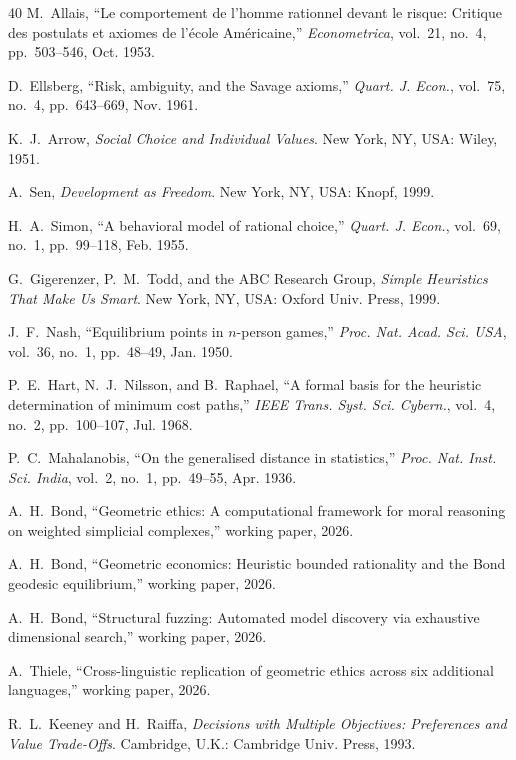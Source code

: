 \documentclass[journal]{IEEEtran}
\begin{document}
\begin{thebibliography}{40}
M.~Allais, ``Le comportement de l'homme rationnel devant le risque: Critique des postulats et axiomes de l'\'{e}cole Am\'{e}ricaine,''
\emph{Econometrica}, vol.~21, no.~4, pp.~503--546, Oct. 1953.

D.~Ellsberg, ``Risk, ambiguity, and the Savage axioms,''
\emph{Quart. J. Econ.}, vol.~75, no.~4, pp.~643--669, Nov. 1961.

K.~J.~Arrow, \emph{Social Choice and Individual Values}.
New York, NY, USA: Wiley, 1951.

A.~Sen, \emph{Development as Freedom}.
New York, NY, USA: Knopf, 1999.

H.~A.~Simon, ``A behavioral model of rational choice,''
\emph{Quart. J. Econ.}, vol.~69, no.~1, pp.~99--118, Feb. 1955.

G.~Gigerenzer, P.~M.~Todd, and the ABC Research Group, \emph{Simple Heuristics That Make Us Smart}.
New York, NY, USA: Oxford Univ. Press, 1999.

J.~F.~Nash, ``Equilibrium points in $n$-person games,''
\emph{Proc. Nat. Acad. Sci. USA}, vol.~36, no.~1, pp.~48--49, Jan. 1950.

P.~E.~Hart, N.~J.~Nilsson, and B.~Raphael, ``A formal basis for the heuristic determination of minimum cost paths,''
\emph{IEEE Trans. Syst. Sci. Cybern.}, vol.~4, no.~2, pp.~100--107, Jul. 1968.

P.~C.~Mahalanobis, ``On the generalised distance in statistics,''
\emph{Proc. Nat. Inst. Sci. India}, vol.~2, no.~1, pp.~49--55, Apr. 1936.

A.~H.~Bond, ``Geometric ethics: A computational framework for moral reasoning on weighted simplicial complexes,''
working paper, 2026.

A.~H.~Bond, ``Geometric economics: Heuristic bounded rationality and the Bond geodesic equilibrium,''
working paper, 2026.

A.~H.~Bond, ``Structural fuzzing: Automated model discovery via exhaustive dimensional search,''
working paper, 2026.

A.~Thiele, ``Cross-linguistic replication of geometric ethics across six additional languages,''
working paper, 2026.

R.~L.~Keeney and H.~Raiffa, \emph{Decisions with Multiple Objectives: Preferences and Value Trade-Offs}.
Cambridge, U.K.: Cambridge Univ. Press, 1993.


\end{thebibliography}
\end{document}
